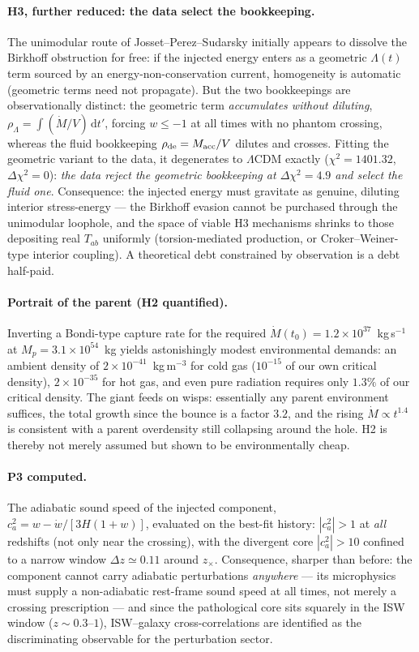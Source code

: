 \documentclass[11pt]{article}
\begin{document}
\paragraph{H3, further reduced: the data select the bookkeeping.} The unimodular route of Josset--Perez--Sudarsky \cite{Josset2017} initially appears to dissolve the Birkhoff obstruction for free: if the injected energy enters as a geometric $\Lambda(t)$ term sourced by an energy-non-conservation current, homogeneity is automatic (geometric terms need not propagate). But the two bookkeepings are observationally distinct: the geometric term \emph{accumulates without diluting}, $\rho_\Lambda = \int (\dot M/V)\,\mathrm{d}t'$, forcing $w \leq -1$ at all times with no phantom crossing, whereas the fluid bookkeeping $\rho_{\rm de} = M_{\rm acc}/V$ dilutes and crosses. Fitting the geometric variant to the data, it degenerates to $\Lambda$CDM exactly ($\chi^2 = 1401.32$, $\Delta\chi^2 = 0$): \emph{the data reject the geometric bookkeeping at $\Delta\chi^2 = 4.9$ and select the fluid one}. Consequence: the injected energy must gravitate as genuine, diluting interior stress-energy --- the Birkhoff evasion cannot be purchased through the unimodular loophole, and the space of viable H3 mechanisms shrinks to those depositing real $T_{ab}$ uniformly (torsion-mediated production, or Croker--Weiner-type interior coupling). A theoretical debt constrained by observation is a debt half-paid.

\paragraph{Portrait of the parent (H2 quantified).} Inverting a Bondi-type capture rate for the required $\dot M(t_0) = 1.2\times10^{37}$~kg\,s$^{-1}$ at $M_p = 3.1\times10^{54}$~kg yields astonishingly modest environmental demands: an ambient density of $2\times10^{-41}$~kg\,m$^{-3}$ for cold gas ($10^{-15}$ of our own critical density), $2\times10^{-35}$ for hot gas, and even pure radiation requires only $1.3\%$ of our critical density. The giant feeds on wisps: essentially any parent environment suffices, the total growth since the bounce is a factor $3.2$, and the rising $\dot M \propto t^{1.4}$ is consistent with a parent overdensity still collapsing around the hole. H2 is thereby not merely assumed but shown to be environmentally cheap.

\paragraph{P3 computed.} The adiabatic sound speed of the injected component, $c_a^2 = w - \dot w/[3H(1+w)]$, evaluated on the best-fit history: $|c_a^2| > 1$ at \emph{all} redshifts (not only near the crossing), with the divergent core $|c_a^2|>10$ confined to a narrow window $\Delta z \simeq 0.11$ around $z_\times$. Consequence, sharper than before: the component cannot carry adiabatic perturbations \emph{anywhere} --- its microphysics must supply a non-adiabatic rest-frame sound speed at all times, not merely a crossing prescription --- and since the pathological core sits squarely in the ISW window ($z \sim 0.3$--$1$), ISW--galaxy cross-correlations are identified as the discriminating observable for the perturbation sector.
\end{document}

